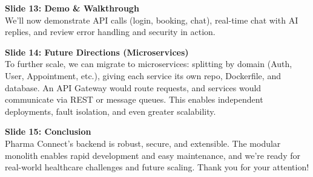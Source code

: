 \documentclass[12pt]{article}
\begin{document}
\vspace{0.3cm}
\textbf{Slide 13: Demo \& Walkthrough}\\
We'll now demonstrate API calls (login, booking, chat), real-time chat with AI replies, and review error handling and security in action.

\vspace{0.3cm}
\textbf{Slide 14: Future Directions (Microservices)}\\
To further scale, we can migrate to microservices: splitting by domain (Auth, User, Appointment, etc.), giving each service its own repo, Dockerfile, and database. An API Gateway would route requests, and services would communicate via REST or message queues. This enables independent deployments, fault isolation, and even greater scalability.

\vspace{0.3cm}
\textbf{Slide 15: Conclusion}\\
Pharma Connect's backend is robust, secure, and extensible. The modular monolith enables rapid development and easy maintenance, and we're ready for real-world healthcare challenges and future scaling. Thank you for your attention!
\end{document}
